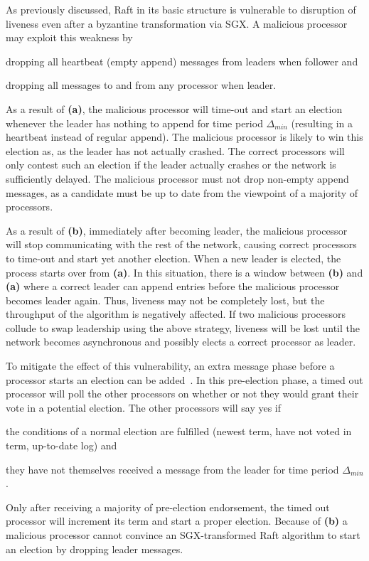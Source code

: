 \documentclass{article}
\begin{document}
	As previously discussed, Raft in its basic structure is vulnerable to disruption of liveness even after a byzantine transformation via SGX.
	A malicious processor may exploit this weakness by
	\begin{enumerate*}[label=\textbf{(\alph*)}]
	  \item dropping all heartbeat (empty append) messages from leaders when follower and
	  \item dropping all messages to and from any processor when leader.
	\end{enumerate*}
	As a result of \textbf{(a)}, the malicious processor will time-out and start an election whenever the leader has nothing to append for time period $\Delta_{min}$ (resulting in a heartbeat instead of regular append).
	The malicious processor is likely to win this election as, as the leader has not actually crashed.
	The correct processors will only contest such an election if the leader actually crashes or the network is sufficiently delayed.
	The malicious processor must not drop non-empty append messages, as a candidate must be up to date from the viewpoint of a majority of processors.

	As a result of \textbf{(b)}, immediately after becoming leader, the malicious processor will stop communicating with the rest of the network, causing correct processors to time-out and start yet another election.
	When a new leader is elected, the process starts over from \textbf{(a)}.
	In this situation, there is a window between \textbf{(b)} and \textbf{(a)} where a correct leader can append entries before the malicious processor becomes leader again.
	Thus, liveness may not be completely lost, but the throughput of the algorithm is negatively affected.
	If two malicious processors collude to swap leadership using the above strategy, liveness will be lost until the network becomes asynchronous and possibly elects a correct processor as leader.

	To mitigate the effect of this vulnerability, an extra message phase before a processor starts an election can be added~\cite{ongaro_search_2014}.
	In this pre-election phase, a timed out processor will poll the other processors on whether or not they would grant their vote in a potential election.
	The other processors will say yes if
	\begin{enumerate*}[label=\textbf{(\alph*)}]
	  \item the conditions of a normal election are fulfilled (newest term, have not voted in term, up-to-date log) and
	  \item they have not themselves received a message from the leader for time period $\Delta_{min}$.
	\end{enumerate*}
	Only after receiving a majority of pre-election endorsement, the timed out processor will increment its term and start a proper election.
	Because of \textbf{(b)} a malicious processor cannot convince an SGX-transformed Raft algorithm to start an election by dropping leader messages.
\end{document}
